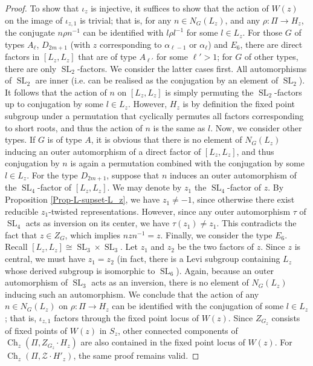\documentclass[11pt,oneside,dvipsnames]{amsart}
\theoremstyle{plain}
\theoremstyle{definition}
\theoremstyle{named}
\DeclareMathOperator{\Ch}{Ch}
\DeclareMathOperator{\PGL}{PGL}
\DeclareMathOperator{\SL}{SL}
\begin{document}
\begin{proof}
To show that $\iota_z$ is injective, it suffices to show that the action of $W(z)$ on the image of $\iota_{z,1}$ is trivial; that is, for any $n\in N_G(L_z)$, and any $\rho:\Pi\rightarrow H_z$, the conjugate $n\rho n^{-1}$ can be identified with $l\rho l^{-1}$ for some $l\in L_z$. For those $G$ of types $A_{\ell}$, $D_{2m+1}$ (with $z$ corresponding to $\alpha_{\ell-1}$ or $\alpha_{\ell}$) and $E_6$, there are direct factors in $[L_z,L_z]$ that are of type $A_{\ell'}$ for some $\ell'>1$; for $G$ of other types, there are only $\SL_2$-factors. We consider the latter cases first. All automorphisms of $\SL_2$ are inner (i.e. can be realised as the conjugation by an element of $\SL_2$). It follows that the action of $n$ on $[L_z,L_z]$ is simply permuting the $\SL_2$-factors up to conjugation by some $l\in L_z$. However, $H_z$ is by definition the fixed point subgroup under a permutation that cyclically permutes all factors corresponding to short roots, and thus the action of $n$ is the same as $l$. Now, we consider other types. If $G$ is of type $A$, it is obvious that there is no element of $N_G(L_z)$ inducing an outer automorphism of a direct factor of $[L_z,L_z]$, and thus conjugation by $n$ is again a permutation combined with the conjugation by some $l\in L_z$. For the type $D_{2m+1}$, suppose that $n$ induces an outer automorphism of the $\SL_4$-factor of $[L_z,L_z]$. We may denote by $z_1$ the $\SL_4$-factor of $z$. By Proposition \ref{Prop-L-supset-L_z}, we have $z_1\ne -1$, since otherwise there exist reducible $z_1$-twisted representations. However, since any outer automorphism $\tau$ of $\SL_4$ acts as inversion on its center, we have $\tau(z_1)\ne z_1$. This contradicts the fact that $z\in Z_G$, which implies $nzn^{-1}=z$. Finally, we consider the type $E_6$. Recall $[L_z,L_z]\cong\SL_3\times\SL_3$. Let $z_1$ and $z_2$ be the two factors of $z$. Since $z$ is central, we must have $z_1=z_2$ (in fact, there is a Levi subgroup containing $L_z$ whose derived subgroup is isomorphic to $\SL_6$). Again, because an outer automorphism of $\SL_3$ acts as an inversion, there is no element of $N_G(L_z)$ inducing such an automorphism. We conclude that the action of any $n\in N_G(L_z)$ on $\rho:\Pi\rightarrow H_z$ can be identified with the conjugation of some $l\in L_z$; that is, $\iota_{z,1}$ factors through the fixed point locus of $W(z)$. Since $Z_{G_z}$ consists of fixed points of $W(z)$ in $S_z$, other connected components of $\Ch_z(\Pi,Z_{G_z}\cdot H_z)$ are also contained in the fixed point locus of $W(z)$. For $\Ch_z(\Pi,\mathscr{Z}\cdot H'_z)$, the same proof remains valid.
\end{proof}

\appendix







\end{document}
